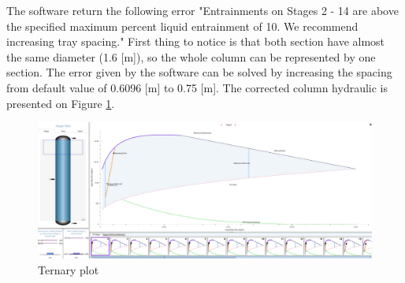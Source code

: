 The software return the following error "Entrainments on Stages 2 - 14 are above the specified maximum percent liquid entrainment of 10. We recommend increasing tray spacing." First thing to notice is that both section have almost the same diameter (1.6 [m]), so the whole column can be represented by one section. The error given by the software can be solved by increasing the spacing from default value of 0.6096 [m] to 0.75 [m]. The corrected column hydraulic is presented on Figure \ref{fig:Ester_Col_hydrarulic_manual}.

\begin{figure}[H]
	\centering
	\includegraphics[width=\textwidth]{Figures/Proces_Analysis/Column_Design_Manual.jpg}
	\caption{Ternary plot}
	\label{fig:Ester_Col_hydrarulic_manual}
\end{figure}






